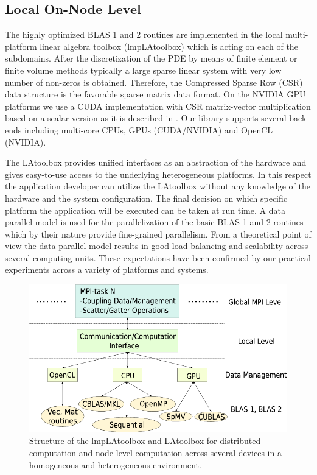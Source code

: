 \documentclass[a4paper, 11pt, twoside]{article}
\begin{document}
\subsection{Local On-Node Level}

The highly optimized BLAS 1 and 2 routines are implemented in the local
multi-platform linear algebra toolbox (lmpLAtoolbox) which is acting on each
of the subdomains. After the discretization of the PDE by means of finite
element or finite volume methods typically a large sparse linear system with
very low number of non-zeros is obtained. Therefore, the Compressed Sparse Row
(CSR) data structure \cite{templates} is the favorable sparse matrix data
format. On the NVIDIA GPU platforms we use a CUDA implementation with CSR
matrix-vector multiplication based on a scalar version as it is described in
\cite{IBM_SPMV,NVIDIA_SPMV}. Our library supports several back-ends including
multi-core CPUs, GPUs (CUDA/NVIDIA) and OpenCL (NVIDIA).

The LAtoolbox provides unified interfaces as an abstraction of the
hardware and gives easy-to-use access to the underlying heterogeneous
platforms. In this respect the application developer can utilize the
LAtoolbox without any knowledge of the hardware and the system configuration.
The final decision on which specific platform the application will be
executed can be taken at run time. A data parallel model is used for the
parallelization of the basic BLAS 1 and 2 routines which by their nature provide
fine-grained parallelism. From a theoretical point of view the data parallel
model results in good load balancing and scalability across several computing
units. These expectations have been confirmed by our practical experiments
across a variety of platforms and systems.

\begin{figure}[ht]
\centering
\includegraphics[scale=0.5]{./fig/LAtoolbox_new_3.png}
\caption{Structure of the lmpLAtoolbox and LAtoolbox
for distributed computation and node-level computation across several devices
in a homogeneous and heterogeneous environment.} 
\label{latoolbox}
\end{figure}
\end{document}
